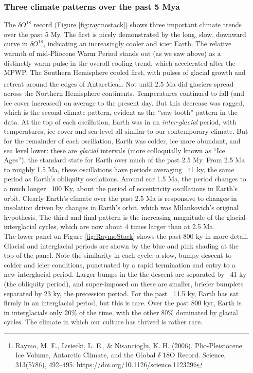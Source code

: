 \documentclass[amstex,12pt]{book}
\begin{document}
\subsubsection{Three climate patterns over the past 5 Mya}
The $\delta O^{18}$ record (Figure \ref{fig:raymostack}) shows three important climate trends over the past 5 My. The first is nicely demonstrated by the long, slow, downward curve in $\delta O^{18}$, indicating an increasingly cooler and icier Earth. The relative warmth of mid-Pliocene Warm Period stands out (as we saw above) as a distinctly warm pulse in the overall cooling trend, which accelerated after the MPWP. The Southern Hemisphere cooled first, with pulses of glacial growth and retreat around the edges of Antarctica\footnote{Raymo, M. E., Lisiecki, L. E., \& Nisancioglu, K. H. (2006). Plio-Pleistocene Ice Volume, Antarctic Climate, and the Global $\delta$ 18O Record. Science, 313(5786), 492–495. https://doi.org/10.1126/science.1123296}. Not until 2.5 Ma did glaciers spread across the Northern Hemisphere continents. Temperatures continued to fall (and ice cover increased) on average to the present day. But this decrease was ragged, which is the second climate pattern, evident as the ``saw-tooth'' pattern in the data. At the top of each oscillation, Earth was in an \emph{inter-glacial} period, with temperatures, ice cover and sea level all similar to our contemporary climate. But for the remainder of each oscillation, Earth was colder, ice more abundant, and sea level lower: these are \emph{glacial} intervals (more colloquially known as ``Ice Ages''), the standard state for Earth over much of the past 2.5 My.  From 2.5 Ma to roughly 1.5 Ma, these oscillations have periods averaging ~41 ky, the same period as Earth's obliquity oscilations. Around ear 1.5 Ma, the period changes to a much longer ~100 Ky, about the period of eccentricity oscillations in Earth's orbit. Clearly Earth's climate over the past 2.5 Ma is responsive to changes in insolation driven by changes in Earth's orbit, which was Milankovich's original hypothesis. The third and final pattern is the increasing magnitude of the glacial-interglacial cycles, which are now about 4 times larger than at 2.5 Ma.\\
The lower panel on Figure \ref{fig:RaymoStack} shows the past 800 ky in more detail. Glacial and interglacial periods are shown by the blue and pink shading at the top of the panel. Note the similarity in each cycle: a slow, bumpy descent to colder and icier conditions, punctuated by a rapid termination and entry to a new interglacial period. Larger bumps in the the descent are separated by ~41 ky (the obliquity period), and super-imposed on these are smaller, briefer bumplets separated by 23 ky, the precession period. For the past ~11.5 ky, Earth has sat firmly in an interglacial period, but this is rare. Over the past 800 kyr, Earth is in interglacials only 20\% of the time, with the other 80\% dominated by glacial cycles. The climate in which our culture has thrived is rather rare.\\
     
\end{document}
